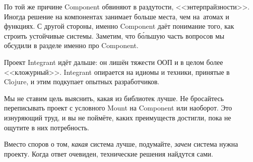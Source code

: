 По той же причине Component обвиняют в раздутости, <<энтерпрайзности>>. Иногда
решение на компонентах занимает больше места, чем на~атомах и функциях. С другой
стороны, именно Component даёт понимание того, как строить устойчивые
системы. Заметим, что б\'{о}льшую часть вопросов мы обсудили в разделе именно
про Component.

Проект Integrant идёт дальше: он лишён тяжести ООП и в целом более
<<кложурный>>. Integrant опирается на идиомы и техники, принятые в Clojure, и
этим подкупает опытных разработчиков.

Мы не ставим цель выяснить, какая из библиотек лучше. Не бросайтесь переписывать
проект с условного Mount на Component или наоборот. Это изнуряющий труд, и вы не
поймёте, каких преимуществ достигли, пока не ощутите в них потребность.

Вместо споров о том, \emph{какая} система лучше, подумайте, \emph{зачем} система
нужна проекту. Когда ответ очевиден, технические решения найдутся сами.
